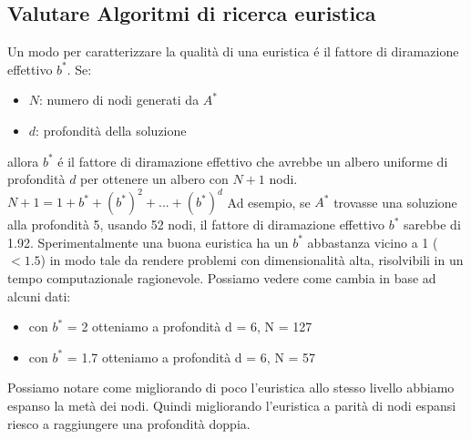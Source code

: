 \documentclass{article}
\begin{document}
\subsection{Valutare Algoritmi di ricerca euristica}
Un modo per caratterizzare la qualità di una euristica é il fattore di diramazione effettivo $b^*$. \newline
Se:
\begin{itemize}
    \item $N$: numero di nodi generati da $A^*$
    \item $d$: profondità della soluzione
\end{itemize}
allora $b^*$ é il fattore di diramazione effettivo che avrebbe un albero uniforme di profondità $d$ per ottenere un albero con $N+1$ nodi. \newline
$N+1 = 1 + b^* + (b^*)^2 + ... + (b^*)^d$ \newline
Ad esempio, se $A^*$ trovasse una soluzione alla profondità 5, usando 52 nodi, il fattore di diramazione effettivo $b^*$ sarebbe di 1.92. \newline
Sperimentalmente una buona euristica ha un $b^*$ abbastanza vicino a 1 ($< 1.5$) in modo tale da rendere problemi con dimensionalità alta, risolvibili in un tempo computazionale ragionevole.\newline
Possiamo vedere come cambia in base ad alcuni dati:
\begin{itemize}
    \item con $b^*$ = 2 otteniamo a profondità d = 6, N = 127
    \item con $b^*$ = 1.7 otteniamo a profondità d = 6, N = 57
\end{itemize}
Possiamo notare come migliorando di poco l'euristica allo stesso livello abbiamo espanso la metà dei nodi. Quindi migliorando l'euristica a parità di nodi espansi riesco a raggiungere una profondità doppia.
\clearpage
\end{document}
